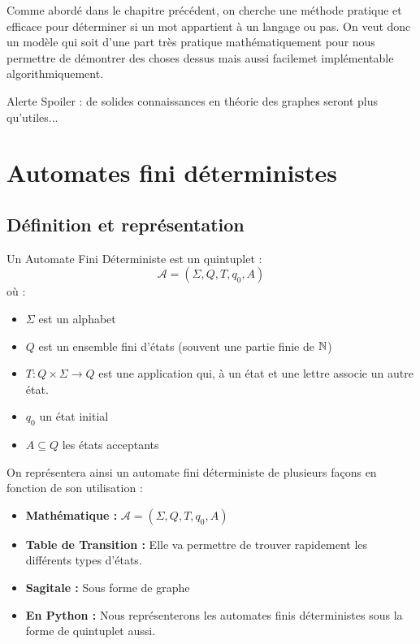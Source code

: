 \minitoc %


Comme abordé dans le chapitre précédent, on cherche une méthode pratique et efficace pour déterminer si un mot appartient 
à un langage ou pas. On veut donc un modèle qui soit d'une part très pratique mathématiquement pour nous permettre de 
démontrer des choses dessus mais aussi facilemet implémentable algorithmiquement. 

Alerte Spoiler : de solides connaissances en théorie des graphes seront plus qu'utiles...


\section{Automates fini déterministes}

\subsection{Définition et représentation}

\begin{definition}
    Un Automate Fini Déterministe est un quintuplet :
        \[ \boxed{ \mathcal{A} = (\Sigma, Q, T, q_0, A) } \] 
    où :
    \begin{itemize}
        \item $\Sigma$ est un alphabet 
        \item $Q$ est un ensemble fini d'états (souvent une partie finie de $\mathbb{N}$)
        \item $T : Q \times \Sigma \longrightarrow Q$ est une application qui, à un état et une lettre associe un autre état. 
        \item $q_0$ un état initial
        \item $A \subseteq Q$ les états acceptants
    \end{itemize}
\end{definition}

On représentera ainsi un automate fini déterministe de plusieurs façons en fonction de son utilisation :
\begin{itemize}
    \item \textbf{Mathématique : } $\mathcal{A} = (\Sigma, Q, T, q_0, A) $
    \item \textbf{Table de Transition : } Elle va permettre de trouver rapidement les différents types d'états. 
    \item \textbf{Sagitale : } Sous forme de graphe 
    \item \textbf{En Python : } Nous représenterons les automates finis déterministes sous la forme de quintuplet aussi. 
\end{itemize}

